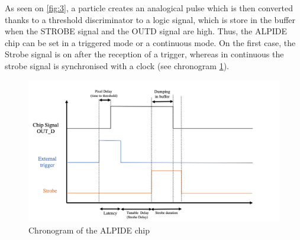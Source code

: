 \documentclass[12pt,oneside,a4]{article}
\begin{document}
    As seen on \ref{fig:3}, a particle creates an analogical pulse which is then converted thanks to a threshold discriminator to a logic signal, which is store in the buffer when the STROBE signal and the OUTD signal are high. Thus, the ALPIDE chip can be set in a triggered mode or a continuous mode. On the first case, the Strobe signal is on after the reception of a trigger, whereas in continuous the strobe signal is synchronised with a clock (see chronogram \ref{fig:4}).

    \begin{figure}[h]
        \centering
        \includegraphics[scale =0.5]{figures/ALPIDE Chronogram.png}
        \caption{Chronogram of the ALPIDE chip}
        \label{fig:4}
    \end{figure}

    
\end{document}
